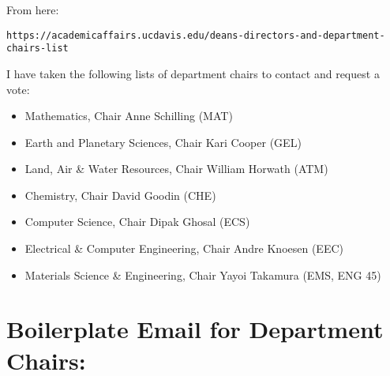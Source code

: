 \documentclass[12pt]{article}
\begin{document}
From here:
\begin{verbatim}
https://academicaffairs.ucdavis.edu/deans-directors-and-department-chairs-list
\end{verbatim}
I have taken the following lists of department chairs to contact and request a vote:

\begin{itemize}
\item Mathematics, Chair Anne Schilling (MAT) 
\item Earth and Planetary Sciences, Chair Kari Cooper (GEL) 
\item Land, Air \& Water Resources, Chair William Horwath (ATM)
\item Chemistry, Chair David Goodin (CHE)
\item Computer Science, Chair Dipak Ghosal (ECS)
\item Electrical \& Computer Engineering, Chair Andre Knoesen (EEC)
\item Materials Science \& Engineering, Chair Yayoi Takamura (EMS, ENG 45)
\end{itemize}

\newpage

\section{Boilerplate Email for Department Chairs:}
\end{document}
